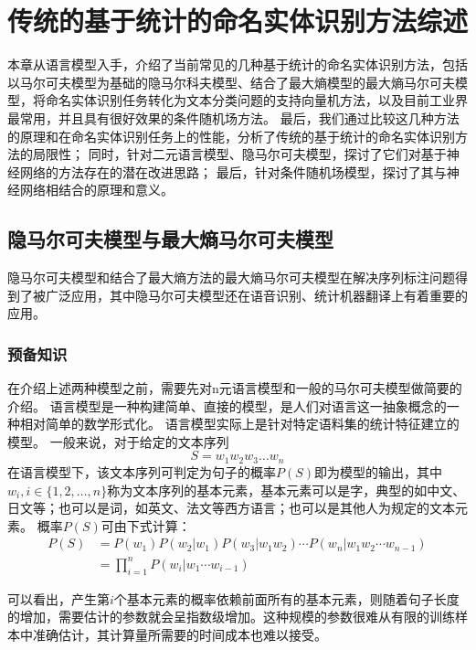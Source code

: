 \chapter{传统的基于统计的命名实体识别方法综述}
本章从语言模型入手，介绍了当前常见的几种基于统计的命名实体识别方法，包括以马尔可夫模型为基础的隐马尔科夫模型、结合了最大熵模型的最大熵马尔可夫模型，将命名实体识别任务转化为文本分类问题的支持向量机方法，以及目前工业界最常用，并且具有很好效果的条件随机场方法。
最后，我们通过比较这几种方法的原理和在命名实体识别任务上的性能，分析了传统的基于统计的命名实体识别方法的局限性；
同时，针对二元语言模型、隐马尔可夫模型，探讨了它们对基于神经网络的方法存在的潜在改进思路；
最后，针对条件随机场模型，探讨了其与神经网络相结合的原理和意义。
\section{隐马尔可夫模型与最大熵马尔可夫模型}
\label{chap:HMM}
隐马尔可夫模型和结合了最大熵方法的最大熵马尔可夫模型在解决序列标注问题得到了被广泛应用，其中隐马尔可夫模型还在语音识别、统计机器翻译上有着重要的应用。
\subsection{预备知识}
在介绍上述两种模型之前，需要先对n元语言模型和一般的马尔可夫模型做简要的介绍。
语言模型是一种构建简单、直接的模型，是人们对语言这一抽象概念的一种相对简单的数学形式化。
语言模型实际上是针对特定语料集的统计特征建立的模型。
一般来说，对于给定的文本序列
\begin{equation}
    S = w_1 w_2 w_3 \dots w_n
\end{equation}
在语言模型下，该文本序列可判定为句子的概率$P(S)$即为模型的输出，其中$w_i, i\in \{1,2,\dots,n\}$称为文本序列的基本元素，基本元素可以是字，典型的如中文、日文等；也可以是词，如英文、法文等西方语言；也可以是其他人为规定的文本元素。
概率$P(S)$可由下式计算：
\begin{align}
    P(S) &= P(w_1)P(w_2 | w_1)P(w_3 | w_1 w_2)\cdots P(w_n | w_1 w_2 \cdots w_{n-1}) \label{eq:n-gram}\\
    &= \prod_{i=1}^{n}P(w_i | w_1 \cdots w_{i-1})
\end{align}

可以看出，产生第$i$个基本元素的概率依赖前面所有的基本元素，则随着句子长度的增加，需要估计的参数就会呈指数级增加。这种规模的参数很难从有限的训练样本中准确估计，其计算量所需要的时间成本也难以接受。

